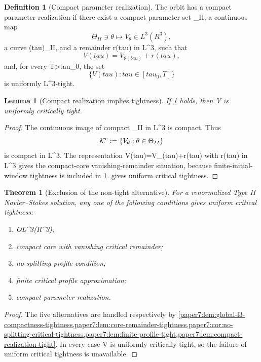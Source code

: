 \documentclass[11pt]{amsart}
\def\({}%
\def\){}%
\def\mathbb#1{#1}%
\def\tau{tau}%
\theoremstyle{plain}
\newtheorem{theorem}{Theorem}[section]
\newtheorem{lemma}[lemma]{Lemma}
\theoremstyle{definition}
\newtheorem{definition}[definition]{Definition}
\theoremstyle{remark}
\begin{document}
\begin{definition}[Compact parameter realization]\label{paper7:def:compact-param-realization}
The orbit has a compact parameter realization if there exist a compact
parameter set \(\Theta_{II}\), a continuous map
\[
  \Theta_{II}\ni\theta\mapsto V_\theta\in L^3(\mathbb R^3),
\]
a curve \(\theta(\tau)\in\Theta_{II}\), and a remainder \(r(\tau)\) in
\(L^3\), such that
\[
  V(\tau)=V_{\theta(\tau)}+r(\tau),
\]
and, for every \(T>\tau_0\), the set
\[
  \{V(\tau):\tau\in[\tau_0,T]\}
\]
is uniformly \(L^3\)-tight.
\end{definition}

\begin{lemma}[Compact realization implies tightness]
\label{paper7:lem:compact-realization-tight}
If \cref{paper7:def:compact-param-realization} holds, then \(V\) is uniformly
critically tight.
\end{lemma}

\begin{proof}
The continuous image of compact \(\Theta_{II}\) in \(L^3\) is compact.  Thus
\[
  \mathcal K^{\rm c}:=\{V_\theta:\theta\in\Theta_{II}\}
\]
is compact in \(L^3\).  The representation
\(V(\tau)=V_{\theta(\tau)}+r(\tau)\) with \(r(\tau)\) in \(L^3\) gives
the compact-core vanishing-remainder situation, because finite-initial-window
tightness is included in \cref{paper7:def:compact-param-realization}.
 gives uniform critical tightness.
\end{proof}

\begin{theorem}[Exclusion of the non-tight alternative]\label{paper7:thm:critical-tightness-criteria}
For a renormalized Type II Navier--Stokes solution, any one of the following
conditions gives uniform critical tightness:
\begin{enumerate}[label=\textup{(\roman*)}]
\item \(\mathcal O\Subset L^3(\mathbb R^3)\);
\item compact core with vanishing critical remainder;
\item no-splitting profile condition;
\item finite critical profile approximation;
\item compact parameter realization.
\end{enumerate}
\end{theorem}

\begin{proof}
The five alternatives are handled respectively by
\cref{paper7:lem:global-l3-compactness-tightness,paper7:lem:core-remainder-tightness,paper7:cor:no-splitting-critical-tightness,paper7:lem:finite-profile-tight,paper7:lem:compact-realization-tight}.
In every case \(V\) is uniformly critically tight, so the failure of uniform
critical tightness is unavailable.
\end{proof}
\end{document}
